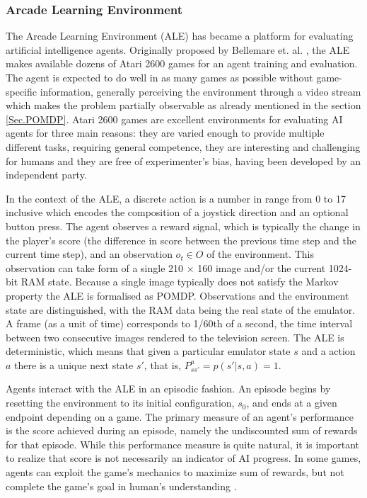 \subsubsection{Arcade Learning Environment} \label{Sec.ALE}

The Arcade Learning Environment (ALE) has became a platform for evaluating artificial intelligence agents. Originally proposed by Bellemare et. al. \cite{Code.ALE}, the ALE makes available dozens of Atari 2600 games for an agent training and evaluation. The agent is expected to do well in as many games as possible without game-specific information, generally perceiving the environment through a video stream which makes the problem partially observable as already mentioned in the section \ref{Sec.POMDP}. Atari 2600 games are excellent environments for evaluating AI agents for three main reasons: they are varied enough to provide multiple different tasks, requiring general competence, they are interesting and challenging for humans and they are free of experimenter’s bias, having been developed by an independent party.

In the context of the ALE, a discrete action is a number in range from 0 to 17 inclusive which encodes the composition of a joystick direction and an optional button press. The agent observes a reward signal, which is typically the change in the player’s score (the difference in score between the previous time step and the current time step), and an observation $o_t \in O$ of the environment. This observation can take form of a single 210 × 160 image and/or the current 1024-bit RAM state. Because a single image typically does not satisfy the Markov property the ALE is formalised as POMDP. Observations and the environment state are distinguished, with the RAM data being the real state of the emulator. A frame (as a unit of time) corresponds to 1/60th of a second, the time interval between two consecutive images rendered to the television screen. The ALE is deterministic, which means that given a particular emulator state $s$ and a action $a$ there is a unique next state $s'$, that is, $P^a_{ss'} = p(s' | s, a) = 1$.

Agents interact with the ALE in an episodic fashion. An episode begins by resetting the environment to its initial configuration, $s_0$, and ends at a given endpoint depending on a game. The primary measure of an agent’s performance is the score achieved during an episode, namely the undiscounted sum of rewards for that episode. While this performance measure is quite natural, it is important to realize that score is not necessarily an indicator of AI progress. In some games, agents can exploit the game's mechanics to maximize sum of rewards, but not complete the game's goal in human's understanding \cite{Study.FaultyReward}.

